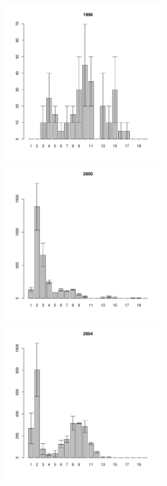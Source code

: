 \begin{figure}[ht]
\begin{multicols}{3}
\hfill
\includegraphics[width=60mm]{../White_Sea/Ryashkov_ZRS/zrs_1996_.pdf}
\hfill
\includegraphics[width=60mm]{../White_Sea/Ryashkov_ZRS/zrs_2000_.pdf}
\hfill
\includegraphics[width=60mm]{../White_Sea/Ryashkov_ZRS/zrs_2004_.pdf}
\end{multicols}



\end{figure}
